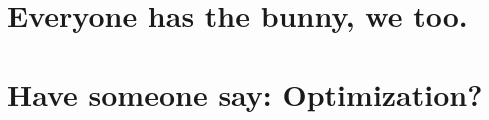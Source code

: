 \section{Everyone has the bunny, we too.}
\label{sec:bunny}



\section{Have someone say: Optimization?}
\label{sec:optimize}
